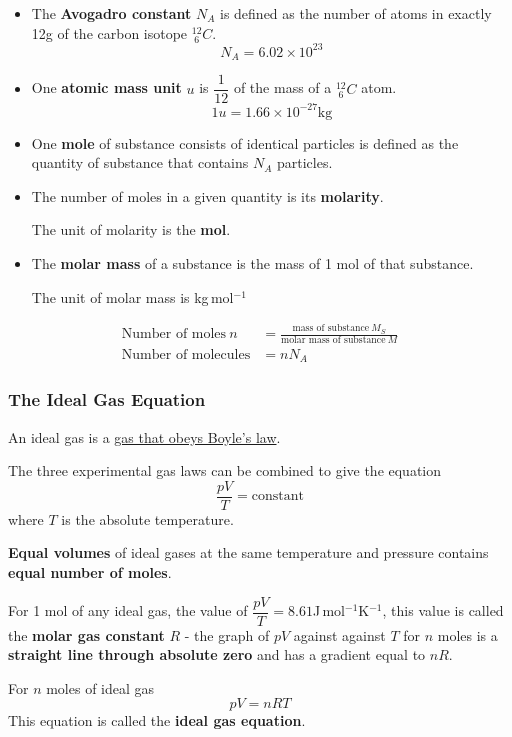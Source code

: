 \begin{itemize}
    \item The \textbf{Avogadro constant} $N_A$ is defined as the number of atoms in exactly 12g of the carbon isotope $^{12}_{\hspace{3pt}6}C$.
        $$N_A=6.02\times10^{23}$$
    \item One \textbf{atomic mass unit} $u$ is $\dfrac{1}{12}$ of the mass of a $^{12}_{\hspace{3pt}6}C$ atom.
        $$1u=1.66\times10^{-27}\text{kg}$$
    \item One \textbf{mole} of substance consists of identical particles is defined as the quantity of substance that contains $N_A$ particles.
    \item The number of moles in a given quantity is its \textbf{molarity}.

        The unit of molarity is the \textbf{mol}.
    \item The \textbf{molar mass} of a substance is the mass of 1 mol of that substance.

        The unit of molar mass is kg\,mol$^{-1}$
\end{itemize}
\begin{align*}
    \text{Number of moles}\ n&=\frac{\text{mass of substance}\ M_S}{\text{molar mass of substance}\ M}\\
    \text{Number of molecules}&=nN_A
\end{align*}

\subsubsection*{The Ideal Gas Equation}

An ideal gas is a \underline{gas that obeys Boyle's law}.

The three experimental gas laws can be combined to give the equation
$$\frac{pV}{T}=\text{constant}$$
where $T$ is the absolute temperature.

\textbf{Equal volumes} of ideal gases at the same temperature and pressure contains \textbf{equal number of moles}.

For 1 mol of any ideal gas, the value of $\dfrac{pV}{T}=8.61$J\,mol$^{-1}$K$^{-1}$, this value is called the \textbf{molar gas constant} $R$ - the graph of $pV$ against against $T$ for $n$ moles is a \textbf{straight line through absolute zero} and has a gradient equal to $nR$.

For $n$ moles of ideal gas
$$pV=nRT$$
This equation is called the \textbf{ideal gas equation}.

